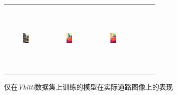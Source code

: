 \documentclass{article}
\begin{document}
\begin{figure}[H]
\begin{tabular}{cccccc}
    \includegraphics[width=0.15\textwidth,height=3.5cm,keepaspectratio]{images/on-the-road/4.jpg} &
    \includegraphics[width=0.15\textwidth,height=3.5cm,keepaspectratio]{images/real_image_trained/depth_colored/4.png} &
    \includegraphics[width=0.15\textwidth,height=3.5cm,keepaspectratio]{images/real_image/depth_colored/4.png} \\
  \end{tabular}
  \caption{仅在\textit{Vkitti}数据集上训练的模型在实际道路图像上的表现}
\end{figure}
\end{document}

